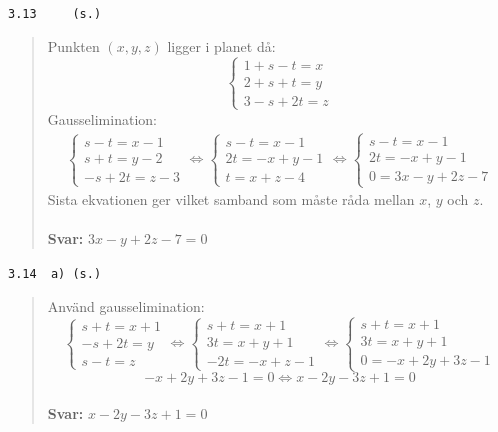 \documentclass[a4paper]{article}
\newcommand{\tskcol}[1]{\textcolor{tskcol}{#1}}
\begin{document}
\texttt{\tskcol{3.13~~~~ (s.)}}
\begin{quotation}
	\noindent
	Punkten $(x,y,z)$ ligger i planet då: 
	\[\begin{cases}
	1+s-t=x \\
	2+s+t=y \\
	3-s+2t=z
	\end{cases}\]
	Gausselimination:
	\begin{align*}
	\begin{cases}
	s-t=x-1 \\
	s+t=y-2 \\
	-s+2t=z-3
	\end{cases} \Leftrightarrow
	\begin{cases}
	s-t=x-1 \\
	2t=-x+y-1 \\
	t=x+z-4
	\end{cases} \Leftrightarrow
	\begin{cases}
	s-t=x-1 \\
	2t=-x+y-1 \\
	0=3x-y+2z-7
	\end{cases}
	\end{align*}
	Sista ekvationen ger vilket samband som måste råda mellan $x$, $y$ och $z$.
	\\ \\
	\textbf{Svar:} $3x-y+2z-7=0$
\end{quotation}

\texttt{\tskcol{3.14~~a) (s.)}}
\begin{quotation}
	\noindent
	Använd gausselimination:
	\[\begin{cases}
	s+t=x+1 \\
	-s+2t=y \\
	s-t=z
	\end{cases} \Leftrightarrow
	\begin{cases}
	s+t=x+1 \\
	3t=x+y+1 \\
	-2t=-x+z-1
	\end{cases} \Leftrightarrow
	\begin{cases}
	s+t=x+1 \\
	3t=x+y+1 \\
	0=-x+2y+3z-1
	\end{cases}\]
	\[-x+2y+3z-1=0 \Leftrightarrow
	x-2y-3z+1=0\]
	\\
	\textbf{Svar:} $x-2y-3z+1=0$
\end{quotation}
\end{document}
